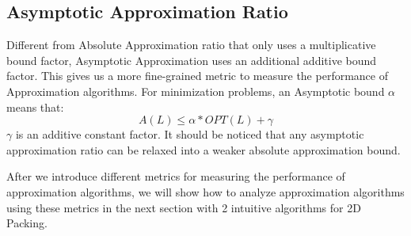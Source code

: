 \documentclass[sigplan,screen,nonacm]{acmart}\settopmatter{printfolios=true,printccs=false,printacmref=false}
\begin{document}
\subsection{Asymptotic Approximation Ratio}
Different from Absolute Approximation ratio that only uses a multiplicative bound factor, Asymptotic Approximation uses an additional additive bound factor. This gives us a more fine-grained metric to measure the performance of Approximation algorithms. For minimization problems, an Asymptotic bound $\alpha$ means that:
$$ A(L) \leq \alpha*OPT(L) + \gamma $$
$\gamma$ is an additive constant factor. It should be noticed that any asymptotic approximation ratio can be relaxed into a weaker absolute approximation bound.\par
After we introduce different metrics for measuring the performance of approximation algorithms, we will show how to analyze approximation algorithms using these metrics in the next section with 2 intuitive algorithms for 2D Packing.
\end{document}
